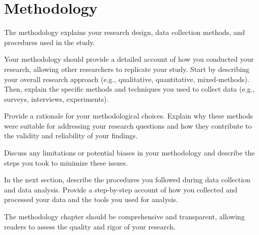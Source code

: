 \chapter{Methodology}

The methodology explains your research design, data collection methods, and procedures used in the study.

Your methodology should provide a detailed account of how you conducted your research, allowing other researchers to replicate your study. Start by describing your overall research approach (e.g., qualitative, quantitative, mixed-methods). Then, explain the specific methods and techniques you used to collect data (e.g., surveys, interviews, experiments).

Provide a rationale for your methodological choices. Explain why these methods were suitable for addressing your research questions and how they contribute to the validity and reliability of your findings.

Discuss any limitations or potential biases in your methodology and describe the steps you took to minimize these issues.

In the next section, describe the procedures you followed during data collection and data analysis. Provide a step-by-step account of how you collected and processed your data and the tools you used for analysis.

The methodology chapter should be comprehensive and transparent, allowing readers to assess the quality and rigor of your research.

